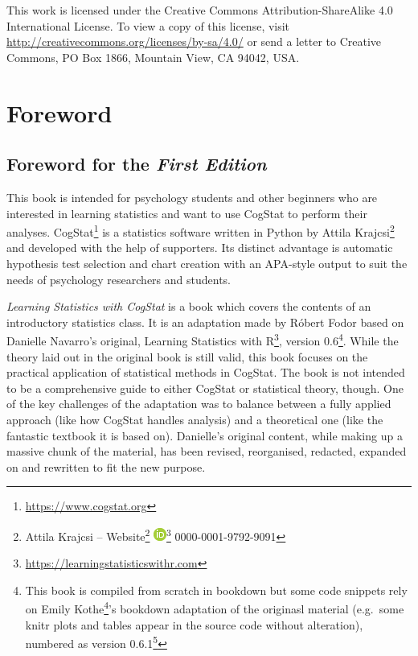 \documentclass[
  11pt,
  a4paper,
  twoside,symmetric,openright]{book}
\theoremstyle{break}
\theoremstyle{break}
\DeclareRobustCommand{\href}[2]{#2\footnote{\url{#1}}}
\begin{document}
This work is licensed under the Creative Commons Attribution-ShareAlike 4.0 International License. To view a copy of this license, visit \url{http://creativecommons.org/licenses/by-sa/4.0/} or send a letter to Creative Commons, PO Box 1866, Mountain View, CA 94042, USA.

\chapter*{Foreword}\label{foreword}

\section*{\texorpdfstring{Foreword for the \emph{First Edition}}{Foreword for the First Edition}}\label{foreword-for-the-first-edition}

This book is intended for psychology students and other beginners who are interested in learning statistics and want to use CogStat to perform their analyses. \href{https://www.cogstat.org}{CogStat} is a statistics software written in Python by Attila Krajcsi\footnote{Attila Krajcsi -- \href{http://www.attilakrajcsi.hu}{Website} \textbar{} \href{https://orcid.org/0000-0001-9792-9091}{\includegraphics{resources/image/orcid_16x16.png}} 0000-0001-9792-9091} and developed with the help of supporters. Its distinct advantage is automatic hypothesis test selection and chart creation with an APA-style output to suit the needs of psychology researchers and students.

\emph{Learning Statistics with CogStat} is a book which covers the contents of an introductory statistics class. It is an adaptation made by Róbert Fodor based on Danielle Navarro's original, \href{https://learningstatisticswithr.com}{Learning Statistics with R}, version 0.6\footnote{This book is compiled from scratch in bookdown but some code snippets rely on \href{https://twitter.com/emilyandthelime}{Emily Kothe}'s bookdown adaptation of the originasl material (e.g.~some knitr plots and tables appear in the source code without alteration), numbered as version \href{https://learningstatisticswithr.com/book/}{0.6.1}}. While the theory laid out in the original book is still valid, this book focuses on the practical application of statistical methods in CogStat. The book is not intended to be a comprehensive guide to either CogStat or statistical theory, though. One of the key challenges of the adaptation was to balance between a fully applied approach (like how CogStat handles analysis) and a theoretical one (like the fantastic textbook it is based on). Danielle's original content, while making up a massive chunk of the material, has been revised, reorganised, redacted, expanded on and rewritten to fit the new purpose.
\end{document}
